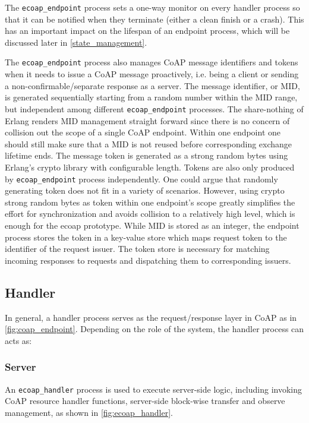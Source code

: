 The \verb|ecoap_endpoint| process sets a one-way monitor on every handler process so that it can be notified when they terminate (either a clean finish or a crash). This has an important impact on the lifespan of an endpoint process, which will be discussed later in \autoref{state_management}. 

The \verb|ecoap_endpoint| process also manages CoAP message identifiers and tokens when it needs to issue a CoAP message proactively, i.e. being a client or sending a non-confirmable/separate response as a server. The message identifier, or MID, is generated sequentially starting from a random number within the MID range, but independent among different \verb|ecoap_endpoint| processes. The share-nothing of Erlang renders MID management straight forward since there is no concern of collision out the scope of a single CoAP endpoint. Within one endpoint one should still make sure that a MID is not reused before corresponding exchange lifetime ends. The message token is generated as a strong random bytes using Erlang's crypto library with configurable length. Tokens are also only produced by \verb|ecoap_endpoint| process independently. One could argue that randomly generating token does not fit in a variety of scenarios. However, using crypto strong random bytes as token within one endpoint's scope greatly simplifies the effort for synchronization and avoids collision to a relatively high level, which is enough for the ecoap prototype. While MID is stored as an integer, the endpoint process stores the token in a key-value store which maps request token to the identifier of the request issuer. The token store is necessary for matching incoming responses to requests and dispatching them to corresponding issuers.

\subsection{Handler}\label{coap_handler}

In general, a handler process serves as the request/response layer in CoAP as in \autoref{fig:coap_endpoint}. Depending on the role of the system, the handler process can acts as:

\subsubsection{Server}

An \verb|ecoap_handler| process is used to execute server-side logic, including invoking CoAP resource handler functions, server-side block-wise transfer and observe management, as shown in \autoref{fig:ecoap_handler}. 

